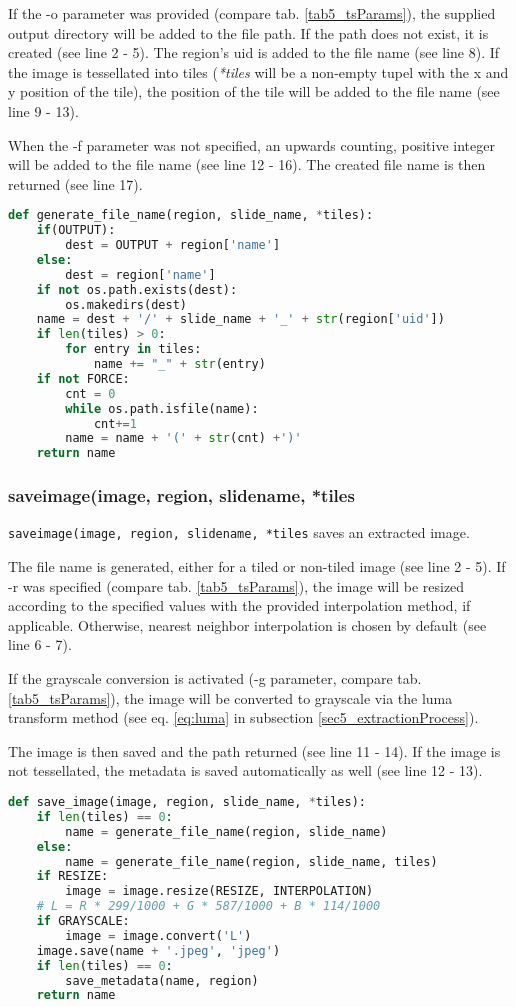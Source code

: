 If the -o parameter was provided (compare tab. \ref{tab5_tsParams}), the supplied output directory will be added to the file path. If the path does not exist, it is created (see line 2 - 5). The region's uid is added to the file name (see line 8). If the image is tessellated into tiles (\emph{*tiles} will be a non-empty tupel with the x and y position of the tile), the position of the tile will be added to the file name (see line 9 - 13).

When the -f parameter was not specified, an upwards counting, positive integer will be added to the file name (see line 12 - 16). The created file name is then returned (see line 17). 

\begin{lstlisting}[frame=single,language=python]
def generate_file_name(region, slide_name, *tiles):
	if(OUTPUT):
		dest = OUTPUT + region['name']
	else:
		dest = region['name']
	if not os.path.exists(dest):
		os.makedirs(dest)
	name = dest + '/' + slide_name + '_' + str(region['uid'])
	if len(tiles) > 0:
		for entry in tiles:
			name += "_" + str(entry)
	if not FORCE:
		cnt = 0
		while os.path.isfile(name):
			cnt+=1
		name = name + '(' + str(cnt) +')'
	return name
\end{lstlisting}


\subsubsection{save{\textunderscore}image(image, region, slide{\textunderscore}name, *tiles}
\texttt{save{\textunderscore}image(image, region, slide{\textunderscore}name, *tiles} saves an extracted image. 

The file name is generated, either for a tiled or non-tiled image (see line 2 - 5). If -r was specified (compare tab. \ref{tab5_tsParams}), the image will be resized according to the specified values with the provided interpolation method, if applicable. Otherwise, nearest neighbor interpolation is chosen by default (see line 6 - 7).

If the grayscale conversion is activated (-g parameter, compare tab. \ref{tab5_tsParams}), the image will be converted to grayscale via the luma transform method (see eq. \ref{eq:luma} in subsection \ref{sec5_extractionProcess}).

The image is then saved and the path returned (see line 11 - 14). If the image is not tessellated, the metadata is saved automatically as well (see line 12 - 13).

\begin{lstlisting}[frame=single,language=python]
def save_image(image, region, slide_name, *tiles):
	if len(tiles) == 0:
		name = generate_file_name(region, slide_name)
	else:
		name = generate_file_name(region, slide_name, tiles)
	if RESIZE:
		image = image.resize(RESIZE, INTERPOLATION)
	# L = R * 299/1000 + G * 587/1000 + B * 114/1000
	if GRAYSCALE:
		image = image.convert('L')
	image.save(name + '.jpeg', 'jpeg')
	if len(tiles) == 0:
		save_metadata(name, region)
	return name
\end{lstlisting}


